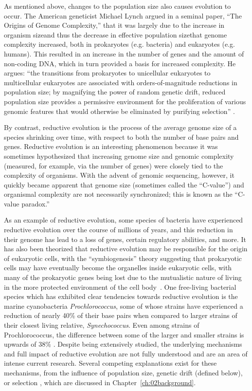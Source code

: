 As mentioned above, changes to the population size also causes evolution to occur. The American geneticist Michael Lynch argued in a seminal paper, ``The Origins of Genome Complexity,'' that it was largely due to the increase in organism size\textemdash and thus the decrease in effective population size\textemdash that genome complexity increased, both in prokaryotes (e.g. bacteria) and eukaryotes (e.g. humans). This resulted in an increase in the number of genes and the amount of non-coding DNA, which in turn provided a basis for increased complexity. He argues: ``the transitions from prokaryotes to unicellular eukaryotes to multicellular eukaryotes are associated with orders-of-magnitude reductions in population size; by magnifying the power of random genetic drift, reduced population size provides a permissive environment for the proliferation of various genomic features that would otherwise be eliminated by purifying selection'' \cite{Lynch1401}. 

By contrast, reductive evolution is the process of the average genome size of a species shrinking over time, with respect to both the number of base pairs and genes. Reductive evolution is an interesting phenomenon because it was sometimes hypothesized that increasing genome size and genomic complexity (measured, for example, via the number of genes) were closely tied to the complexity of organisms. With the advent of genomic sequencing, however, it quickly became apparent that genome size (sometimes called the ``C-value'') and organismal complexity are not necessarily synchronized; this is known as the ``C-value paradox.'' 

As an example of reductive evolution, some species of bacteria have experienced reductive evolution over the course of millions of years, and this reduction in their genome has lead to a loss of genes, certain regulatory abilities, and more. It has also been theorized that reductive evolution may be responsible for the origin of eukaryotic cells, with the ``symbiogenesis'' theory suggesting that prokaryotic cells may have eventually become the organelles inside eukaryotic cells, with many of the prokaryotic genes being lost due to the mutualistic nature of living in the more protected environment of the cell body~\cite{sagan1967origin}. One free-living bacterial species which has exhibited clear tendencies towards reductive evolution is the marine cyanobacteria \textit{Prochlorococcus}, some of whose strains have experienced a reduction of nearly 40\% of their base pairs when compared to larger strains of their closest living relative, \textit{Synechococcus}. Even among strains of Prochlorococcus, the difference between some of the larger and smaller strains is upwards of 38\% \cite{Batut.2014}. Despite being extensively studied, the underlying mechanisms and full impact of reductive evolution are not fully understood and are an area of intense current research. Several competing explanations exist for these mechanisms, from the influence of population size, genetic drift (defined below), or selection \cite{Batut.2014}, which are discussed in Chapter~\ref{ch:02background}. 


